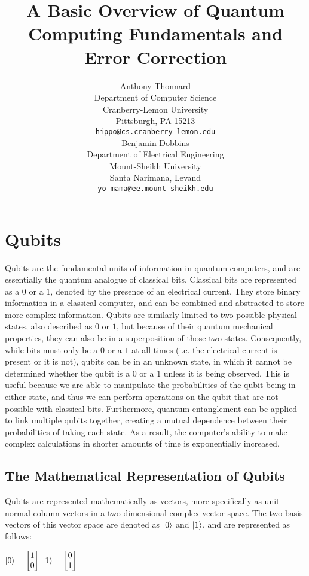 \documentclass{article}
\title{A Basic Overview of Quantum Computing Fundamentals and Error Correction}
\author{Anthony Thonnard \\
	Department of Computer Science\\
	Cranberry-Lemon University\\
	Pittsburgh, PA 15213 \\
	\texttt{hippo@cs.cranberry-lemon.edu} \\
	\And
	Benjamin Dobbins \\
	Department of Electrical Engineering\\
	Mount-Sheikh University\\
	Santa Narimana, Levand \\
	\texttt{yo-mama@ee.mount-sheikh.edu} \\
}
\begin{document}
\maketitle
\begin{abstract}
	\lipsum[1]
\end{abstract}



\twocolumn[]
\section{Qubits}
\label{sec:qubits}
Qubits are the fundamental units of information in quantum computers, and are essentially the quantum analogue of classical bits. Classical bits are represented as a $0$ or 
a $1$, denoted by the presence of an electrical current. They store binary information in a classical computer, and can be combined and abstracted to store more complex 
information. Qubits are similarly limited to two possible physical states, also described as $0$ or $1$, but because of their quantum mechanical properties, they can also be 
in a superposition of those two states. Consequently, while bits must only be a $0$ or a $1$ at all times (i.e. the electrical current is present or it is not), qubits 
can be in an unknown state, in which it cannot be determined whether the qubit is a $0$ or a $1$ unless it is being observed. This is useful because we are able to manipulate 
the probabilities of the qubit being in either state, and thus we can perform operations on the qubit that are not possible with classical bits. Furthermore, 
quantum entanglement can be applied to link multiple qubits together, creating a mutual dependence between their probabilities of taking each state. As a result, the computer's
ability to make complex calculations in shorter amounts of time is exponentially increased.

\subsection{The Mathematical Representation of Qubits}
\label{sec:mathrep}
Qubits are represented mathematically as vectors, more specifically as unit normal column vectors in a two-dimensional complex vector space. The two basis vectors of this 
vector space are denoted as $\ket{0}$ and $\ket{1}$, and are represented as follows: 

\begin{center}
	$\ket{0} = \begin{bmatrix} 1 \\ 0 \end{bmatrix}$ \hspace{1cm} $\ket{1} = \begin{bmatrix} 0 \\ 1 \end{bmatrix}$	
\end{center}
\end{document}
